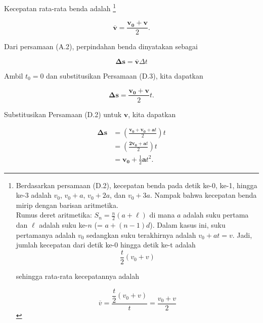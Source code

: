 \documentclass[12pt, a4paper]{article}\usepackage[utf8]{inputenc}
\theoremstyle{plain}
\theoremstyle{plain}
\numberwithin{equation}{section}
\theoremstyle{definition}
\begin{document}
	Kecepatan rata-rata benda adalah \footnote{Berdasarkan persamaan (D.2), kecepatan benda pada detik ke-0, ke-1, hingga ke-3 adalah $v_0$, $v_0 + a$, $v_0 + 2a$, dan $v_0 + 3a$. Nampak bahwa kecepatan benda mirip dengan barisan aritmetika. \\
		Rumus deret aritmetika: $S_n = \frac{n}{2} \left( a + \ell \right) $ di mana $a$ adalah suku pertama dan $\ell$ adalah suku ke-$n$ (= $a + (n-1)d$). Dalam kasus ini, suku pertamanya adalah $v_0$ sedangkan suku terakhirnya adalah $v_0 + at = v$. Jadi, jumlah kecepatan dari detik ke-0 hingga detik ke-t adalah
		\begin{equation*}
			\frac{t}{2} \left( v_0 + v \right) 
		\end{equation*}
		
		sehingga rata-rata kecepatannya adalah
		
		\vspace{-2em}
		
		\begin{equation*}
			\overline{v} = \frac{\dfrac{t}{2} \left( v_0 + v \right) }{t} = \frac{v_0 + v}{2}
		\end{equation*}
	}
	
	\begin{equation}
		\boldsymbol{\overline{v}} = \frac{\boldsymbol{v_0} + \boldsymbol{v}}{2}.
	\end{equation}
	
	

	Dari persamaan (A.2), perpindahan benda dinyatakan sebagai
	
	\begin{equation*}
		\boldsymbol{\Delta s} = \overline{\boldsymbol{v}} \Delta t
	\end{equation*}

	Ambil $t_0 = 0$ dan substitusikan Persamaan (D.3), kita dapatkan
	
	\begin{equation*}
		\boldsymbol{\Delta s} = \frac{\boldsymbol{v_0} + \boldsymbol{v}}{2} t. \tag{D.3,5}
	\end{equation*}
	
	Substitusikan Persamaan (D.2) untuk $\boldsymbol{v}$, kita dapatkan
	
	\begin{align*}
		\boldsymbol{\Delta s} &= \left( \frac{\boldsymbol{v_0} + \boldsymbol{v_0} + \boldsymbol{a} t}{2} \right)  t\\[.5em]
		&= \left( \frac{\boldsymbol{2v_0} + \boldsymbol{a} t}{2} \right) t \\[.5em]
		&= \boldsymbol{v_0} + \frac{1}{2} \boldsymbol{a} t^2.
	\end{align*}
	
\end{document}
